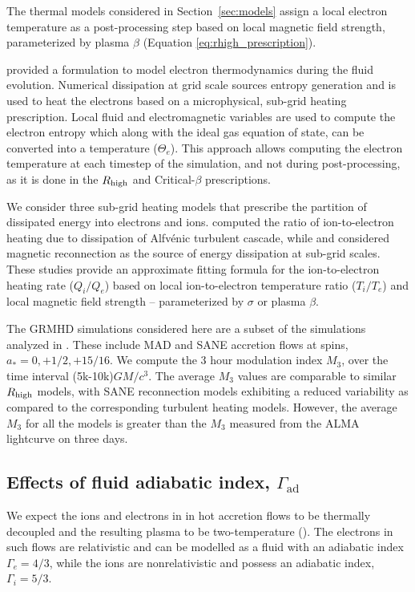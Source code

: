 The thermal models considered in Section~\ref{sec:models} assign a local electron temperature as a post-processing step based on local magnetic field strength, parameterized by plasma $\beta$ (Equation \ref{eq:rhigh_prescription}).

\citealt{10.1093/mnras/stv2084} provided a formulation to model electron thermodynamics during the fluid evolution. Numerical dissipation at grid scale sources entropy generation and is used to heat the electrons based on a microphysical, sub-grid heating prescription. Local fluid and electromagnetic variables are used to compute the electron entropy which along with the ideal gas equation of state, can be converted into a temperature ($\Theta_{e}$). This approach allows computing the electron temperature at each timestep of the simulation, and not during post-processing, as it is done in the $R_\mathrm{high}$ and Critical-$\beta$ prescriptions.

We consider three sub-grid heating models that prescribe the partition of dissipated energy into electrons and ions. \citealt{2010MNRAS.409L.104H} computed the ratio of ion-to-electron heating due to dissipation of Alfv\'enic turbulent cascade, while \citealt{10.1093/mnras/stx2530} and \citealt{Rowan_2017} considered magnetic reconnection as the source of energy dissipation at sub-grid scales. These studies provide an approximate fitting formula for the ion-to-electron heating rate ($Q_{i}/Q_{e}$) based on local ion-to-electron temperature ratio ($T_{i}/T_{e}$) and local magnetic field strength -- parameterized by $\sigma$ or plasma $\beta$.

The GRMHD simulations considered here are a subset of the simulations analyzed in \citealt{2020MNRAS.494.4168D}. These include MAD and SANE accretion flows at spins, $a_{*}=0,+1/2,+15/16$. We compute the 3 hour modulation index $M_{3}$, over the time interval (5k-10k)$GM/c^{3}$. The average $M_{3}$ values are comparable to similar $R_\mathrm{high}$ models, with SANE reconnection models exhibiting a reduced variability as compared to the corresponding turbulent heating models. However, the average $M_{3}$ for all the models is greater than the $M_{3}$ measured from the ALMA lightcurve on three days. 

\subsection{Effects of fluid adiabatic index, $\Gamma_\mathrm{ad}$}

We expect the ions and electrons in in hot accretion flows to be thermally decoupled and the resulting plasma to be two-temperature (\citealt{1976ApJ...204..187S, Quataert_1998, 10.1093/mnras/stw3116, Ryan_2018}). The electrons in such flows are relativistic and can be modelled as a fluid with an adiabatic index $\Gamma_{e}=4/3$, while the ions are nonrelativistic and possess an adiabatic index, $\Gamma_{i}=5/3$.

